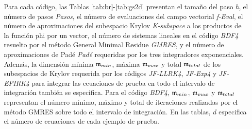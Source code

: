 Para cada código, las Tablas \ref{tab:br}-\ref{tab:gs2d} presentan el tamaño del paso \textit{h}, el número de pasos \textit{Pasos}, el número de evaluaciones del campo vectorial \textit{f-Eval}, el número de aproximaciones del subespacio Krylov \textit{K-subspace} a los productos de la función phi por un vector, el número de sistemas lineales en el código \textit{BDF4} resuelto por el método General Minimal Residue \textit {GMRES}, y el número de aproximaciones de Padé \textit{Padé} requeridas por los tres integradores exponenciales. Además, la dimensión mínima $\mathfrak{m}_{min}$, máxima $\mathfrak{m}_{max}$ y total $\mathfrak{m}_{total}$ de los subespacios de Krylov requerida por los códigos \textit{JF-LLRK4}, \textit{JF-Exp4} y \textit{JF-EPIRK4} para integrar las ecuaciones de prueba en todo el intervalo de integración también se especifica. Para el código \emph{BDF4}, $\mathfrak{m}_{min}$, $\mathfrak{m}_{max}$ y $\mathfrak{m}_{total}$ representan el número mínimo, máximo y total de iteraciones realizadas por el método GMRES sobre todo el intervalo de integración. En las tablas, $d$ especifica el número de ecuaciones de cada ejemplo de prueba.

\vspace{0.1cm}

